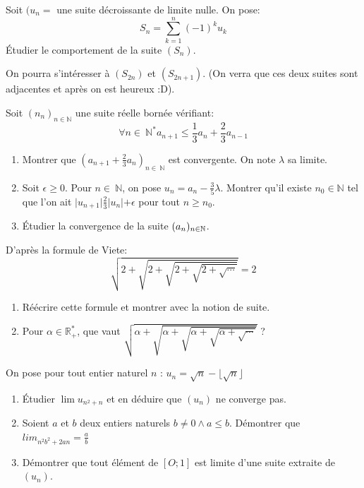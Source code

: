 \documentclass{article}
\begin{document}
\begin{exercise}
    Soit $(u_n=$ une suite décroissante de limite nulle. On pose: \[
        S_n = \sum_{k=1}^n (-1)^k u_k
    \]
    Étudier le comportement de la suite $(S_n)$.
\end{exercise}
\begin{solution}
    On pourra s'intéresser à $(S_{2n})$ et $(S_{2n+1})$. (On verra que ces deux suites sont adjacentes et après on est heureux :D).
\end{solution}
\label{sub:Limites de suites}
\begin{exercise}
    Soit $(n_n)_{n\in \mathbb{N}}$ une suite réelle bornée vérifiant: \[
        \forall n \in~\mathbb{N}^* a_{n+1} \leq \frac{1}{3}a_n + \frac{2}{3} a_{n-1} 
    \]

    \begin{enumerate}
        \item Montrer que $\left( a_{n+1} + \frac{2}{3}a_n \right) _{n \in~\mathbb{N}}$ est convergente. On note $\lambda$ sa limite.
        \item Soit $\epsilon \ge 0$. Pour $n \in~\mathbb{N}$, on pose $u_n = a_n - \frac{3}{5}\lambda$. Montrer qu'il existe $n_0 \in \mathbb{N}$ tel que l'on ait $\lvert u_{n+1} \lvert \frac{2}{3}\lvert u_n \lvert + \epsilon$ pour tout $n\geq n_0$.
        \item Étudier la convergence de la suite $(a_n)_{n\in\mathbb{N}}$.
    \end{enumerate}
\end{exercise}

\begin{exercise}
    D'après la formule de Viete: \[
        \sqrt{2+\sqrt{2+\sqrt{2+{\sqrt{2+\sqrt{\cdots}}}}}} = 2
    \]
    \begin{enumerate}
        \item Réécrire cette formule et montrer avec la notion de suite.
        \item Pour $\alpha \in \mathbb{R}^*_+$, que vaut $\sqrt{\alpha+\sqrt{\alpha+\sqrt{\alpha+{\sqrt{\alpha+\sqrt{\cdots}}}}}}$ ?
    \end{enumerate}
\end{exercise}

\begin{exercise}
    On pose pour tout entier naturel $n$ : $u_n = \sqrt{n} - \lfloor \sqrt{n} \rfloor$
    \begin{enumerate}
        \item Étudier $\lim u_{n^2+n}$ et en déduire que $(u_n)$ ne converge pas.
    \item Soient $a$ et $b$ deux entiers naturels $b\neq 0 \land a \le b$. Démontrer que $lim_{n^2b^2+2an} = \frac{a}{b}$
    \item Démontrer que tout élément de $\left[ O;1 \right]$ est limite d'une suite extraite de $(u_n)$.
    \end{enumerate}
\end{exercise}
\end{document}
